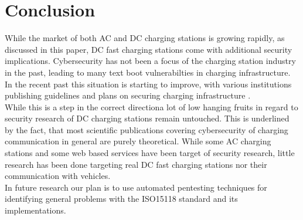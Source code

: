 \documentclass[conference,flushend]{iaria} %
\begin{document}

\section{Conclusion}
While the market of both AC and DC charging stations is growing rapidly, as discussed in this paper, DC fast charging stations come with additional security implications.
Cybersecurity has not been a focus of the charging station industry in the past, leading to many text boot vulnerabilties in charging infrastructure.
In the recent past this situation is starting to improve, with various institutions publishing guidelines and plans on securing charging infrastructure \cite{mccarthy_cybersecurity_2023, encs_security_nodate}. \\
While this is a step in the correct directiona lot of low hanging fruits in regard to security research of DC charging stations remain untouched.
This is underlined by the fact, that most scientific publications covering cybersecurity of charging communication in general are purely theoretical.
While some AC charging stations and some web based services have been target of security research, little research has been done targeting real DC fast charging stations nor their communication with vehicles. \\
In future research our plan is to use automated pentesting techniques for identifying general problems with the ISO15118 standard and its implementations.



\printbibliography
\end{document}
